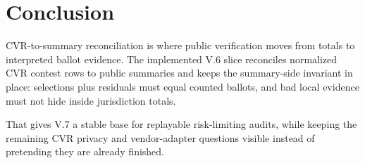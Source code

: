 \section{Conclusion}

CVR-to-summary reconciliation is where public verification moves from totals to
interpreted ballot evidence. The implemented V.6 slice reconciles normalized
CVR contest rows to public summaries and keeps the summary-side invariant in
place: selections plus residuals must equal counted ballots, and bad local
evidence must not hide inside jurisdiction totals.

That gives V.7 a stable base for replayable risk-limiting audits, while keeping
the remaining CVR privacy and vendor-adapter questions visible instead of
pretending they are already finished.
